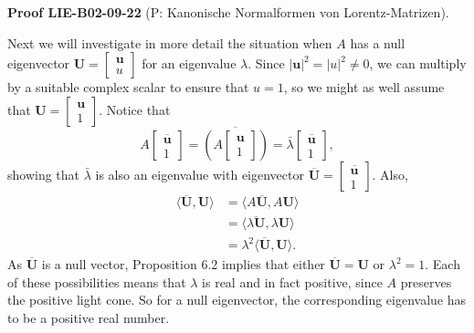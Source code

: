 \documentclass[10pt, letterpaper]{article}
\newcommand{\CustomHeading}[3]{%
  \par\medskip\noindent%
  \textbf{#1 #2} \textnormal{(#3)}.\enskip%
}
\newenvironment{PROOF}[2]{\begin{unitbox}\CustomHeading{Proof}{#1}{#2}}{\end{unitbox}}
\begin{document}
\begin{PROOF}{LIE-B02-09-22}{P: Kanonische Normalformen von Lorentz-Matrizen}
Next we will investigate in more detail the situation when $A$ has a null eigenvector $\mathbf{U}=\left[\begin{array}{l}\mathbf{u} \\ u\end{array}\right]$ for an eigenvalue $\lambda$. Since $|\mathbf{u}|^{2}=|u|^{2} \neq 0$, we can multiply by a suitable complex scalar to ensure that $u=1$, so we might as well assume that $\mathbf{U}=\left[\begin{array}{l}\mathbf{u} \\ 1\end{array}\right]$. Notice that
$$
A\left[\begin{array}{c}
\overline{\mathbf{u}} \\
1
\end{array}\right]=\overline{\left(A\left[\begin{array}{l}
\mathbf{u} \\
1
\end{array}\right]\right)}=\bar{\lambda}\left[\begin{array}{l}
\overline{\mathbf{u}} \\
1
\end{array}\right],
$$
showing that $\bar{\lambda}$ is also an eigenvalue with eigenvector $\overline{\mathbf{U}}=\left[\begin{array}{l}\overline{\mathbf{u}} \\ 1\end{array}\right]$. Also,
$$
\begin{aligned}
\langle\overline{\mathbf{U}}, \mathbf{U}\rangle & =\langle A \overline{\mathbf{U}}, A \mathbf{U}\rangle \\
& =\langle\overline{\lambda \mathbf{U}}, \lambda \mathbf{U}\rangle \\
& =\lambda^{2}\langle\overline{\mathbf{U}}, \mathbf{U}\rangle .
\end{aligned}
$$
As $\overline{\mathbf{U}}$ is a null vector, Proposition 6.2 implies that either $\overline{\mathbf{U}}=\mathbf{U}$ or $\lambda^{2}=1$. Each of these possibilities means that $\lambda$ is real and in fact positive, since $A$ preserves the positive light cone. So for a null eigenvector, the corresponding eigenvalue has to be a positive real number.


\end{PROOF}
\end{document}
